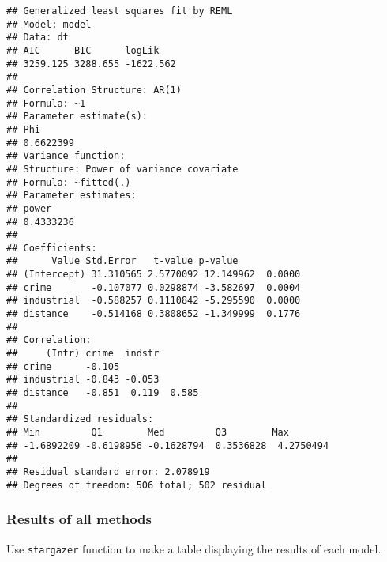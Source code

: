 \documentclass[
  12pt,
]{article}
\newenvironment{Shaded}{\begin{snugshade}}{\end{snugshade}}
\newcommand{\CommentTok}[1]{\textcolor[rgb]{0.56,0.35,0.01}{\textit{#1}}}
\newcommand{\DataTypeTok}[1]{\textcolor[rgb]{0.13,0.29,0.53}{#1}}
\newcommand{\DecValTok}[1]{\textcolor[rgb]{0.00,0.00,0.81}{#1}}
\newcommand{\FloatTok}[1]{\textcolor[rgb]{0.00,0.00,0.81}{#1}}
\newcommand{\KeywordTok}[1]{\textcolor[rgb]{0.13,0.29,0.53}{\textbf{#1}}}
\newcommand{\NormalTok}[1]{#1}
\newcommand{\OperatorTok}[1]{\textcolor[rgb]{0.81,0.36,0.00}{\textbf{#1}}}
\newcommand{\StringTok}[1]{\textcolor[rgb]{0.31,0.60,0.02}{#1}}
\begin{document}
\begin{Shaded}
\end{Shaded}

\begin{Verbatim}
## Generalized least squares fit by REML
## Model: model 
## Data: dt 
## AIC      BIC      logLik
## 3259.125 3288.655 -1622.562
##
## Correlation Structure: AR(1)
## Formula: ~1 
## Parameter estimate(s):
## Phi 
## 0.6622399 
## Variance function:
## Structure: Power of variance covariate
## Formula: ~fitted(.) 
## Parameter estimates:
## power 
## 0.4333236 
##
## Coefficients:
##      Value Std.Error   t-value p-value
## (Intercept) 31.310565 2.5770092 12.149962  0.0000
## crime       -0.107077 0.0298874 -3.582697  0.0004
## industrial  -0.588257 0.1110842 -5.295590  0.0000
## distance    -0.514168 0.3808652 -1.349999  0.1776
## 
## Correlation: 
##     (Intr) crime  indstr
## crime      -0.105              
## industrial -0.843 -0.053       
## distance   -0.851  0.119  0.585
##
## Standardized residuals:
## Min         Q1        Med         Q3        Max 
## -1.6892209 -0.6198956 -0.1628794  0.3536828  4.2750494 
## 
## Residual standard error: 2.078919 
## Degrees of freedom: 506 total; 502 residual
\end{Verbatim}

\hypertarget{results-of-all-methods}{%
\subsubsection{Results of all methods}\label{results-of-all-methods}}

Use \texttt{stargazer} function to make a table displaying the results of each model.
\end{document}
